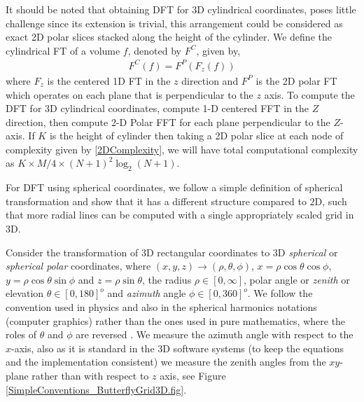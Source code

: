 \documentclass{UCF_ETD}
\begin{document}
 It should be noted that obtaining DFT for 3D cylindrical coordinates, poses little challenge since its extension is trivial, this arrangement could be considered as exact 2D polar slices stacked along the height of the cylinder. We define the cylindrical FT of a volume $f$, denoted by $F^C$, given by,
 \begin{eqnarray}\label{LocalCylindricalFourierTransform}
 F^C(f) = F^P(F_z(f))
 \end{eqnarray}
 where $F_z$ is the centered 1D FT in the $z$ direction and $F^P$ is the 2D polar FT which operates on each plane that is perpendicular to the $z$ axis. To compute the DFT for 3D cylindrical coordinates, compute 1-D centered FFT in the $Z$ direction, then compute 2-D Polar FFT for each plane perpendicular to the $Z$-axis. If $K$ is the height of cylinder then taking a 2D polar slice at each node of complexity given by \eqref{2DComplexity}, we will have total computational complexity as $K \times M/4 \times (N+1)^2 \log_2(N+1)$.
 
 For DFT using spherical coordinates, we follow a simple definition of spherical transformation and show that it has a different structure compared to $2$D, such that more radial lines can be computed with a single appropriately scaled grid in $3$D.
 
 Consider the transformation of $3$D rectangular coordinates to $3$D \emph{spherical} or \emph{spherical polar} coordinates, where $(x,y,z) \rightarrow (\rho, \theta ,\phi)$, $x = \rho \cos \theta \cos\phi $, $y = \rho \cos\theta \sin \phi$ and $z = \rho  \sin \theta$, the radius $\rho \in [0, \infty]$, polar angle or \emph{zenith} or elevation $\theta \in [0, 180]^o$ and \emph{azimuth} angle $\phi \in [0,360]^o$. We follow the convention used in physics and also in the spherical harmonics notations (computer graphics) rather than the ones used in pure mathematics, where the roles of $\theta$ and $\phi$ are reversed \cite{Tevian2002}. We measure the azimuth angle with respect to the $x$-axis, also as it is standard in the 3D software systems (to keep the equations and the implementation consistent) we measure the zenith angles from the $xy$-plane rather than with respect to $z$ axis, see Figure \ref{SimpleConventions_ButterflyGrid3D.fig}.
 
\end{document}
